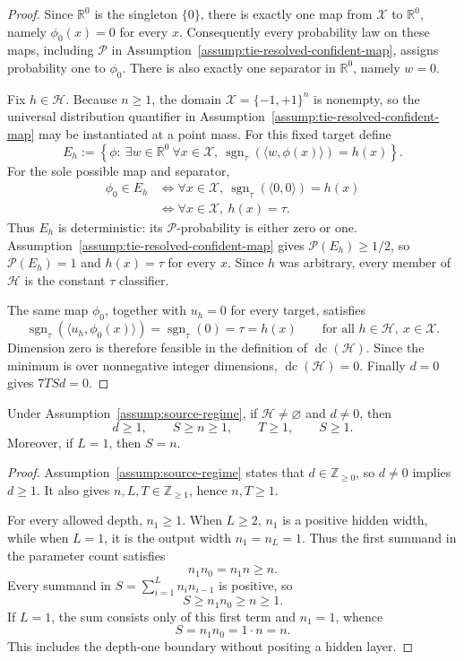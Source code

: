 \begin{proof}
Since $\mathbb R^0$ is the singleton $\{0\}$, there is exactly one map from
$\mathcal X$ to $\mathbb R^0$, namely $\phi_0(x)=0$ for every $x$.
Consequently every probability law on these maps, including $\mathcal P$ in
Assumption~\ref{assump:tie-resolved-confident-map}, assigns probability one
to $\phi_0$.  There is also exactly one separator in $\mathbb R^0$, namely
$w=0$.

Fix $h\in\mathcal H$.  Because $n\geq1$, the domain
$\mathcal X=\{-1,+1\}^n$ is nonempty, so the universal distribution
quantifier in Assumption~\ref{assump:tie-resolved-confident-map} may be
instantiated at a point mass.  For this fixed target define
\[
E_h:=\left\{\phi:\ \exists w\in\mathbb R^0\ \forall x\in\mathcal X,
\ \operatorname{sgn}_{\tau}(\langle w,\phi(x)\rangle)=h(x)\right\}.
\]
For the sole possible map and separator,
\[
\begin{aligned}
\phi_0\in E_h
&\iff
\forall x\in\mathcal X,
\ \operatorname{sgn}_{\tau}(\langle0,0\rangle)=h(x)\\
&\iff
\forall x\in\mathcal X,
\ h(x)=\tau.
\end{aligned}
\]
Thus $E_h$ is deterministic: its $\mathcal P$-probability is either zero or
one.  Assumption~\ref{assump:tie-resolved-confident-map} gives
$\mathcal P(E_h)\geq1/2$, so $\mathcal P(E_h)=1$ and $h(x)=\tau$ for every
$x$.  Since $h$ was arbitrary, every member of $\mathcal H$ is the constant
$\tau$ classifier.

The same map $\phi_0$, together with $u_h=0$ for every target, satisfies
\[
\operatorname{sgn}_{\tau}(\langle u_h,\phi_0(x)\rangle)
=\operatorname{sgn}_{\tau}(0)
=\tau
=h(x)
\qquad
\text{for all }h\in\mathcal H,
\ x\in\mathcal X.
\]
Dimension zero is therefore feasible in the definition of
$\operatorname{dc}(\mathcal H)$.  Since the minimum is over nonnegative
integer dimensions, $\operatorname{dc}(\mathcal H)=0$.  Finally $d=0$
gives $7TSd=0$.
\end{proof}

\begin{proposition}
\label{prop:step-001-architecture}
Under Assumption~\ref{assump:source-regime}, if
$\mathcal H\neq\varnothing$ and $d\neq0$, then
\[
d\geq1,
\qquad
S\geq n\geq1,
\qquad
T\geq1,
\qquad
S\geq1.
\]
Moreover, if $L=1$, then $S=n$.
\end{proposition}

\begin{proof}
Assumption~\ref{assump:source-regime} states that
$d\in\mathbb Z_{\geq0}$, so $d\neq0$ implies $d\geq1$.  It also gives
$n,L,T\in\mathbb Z_{\geq1}$, hence $n,T\geq1$.

For every allowed depth, $n_1\geq1$.  When $L\geq2$, $n_1$ is a positive
hidden width, while when $L=1$, it is the output width $n_1=n_L=1$.  Thus
the first summand in the parameter count satisfies
\[
n_1n_0=n_1n\geq n.
\]
Every summand in $S=\sum_{i=1}^L n_i n_{i-1}$ is positive, so
\[
S\geq n_1n_0\geq n\geq1.
\]
If $L=1$, the sum consists only of this first term and $n_1=1$, whence
\[
S=n_1n_0=1\cdot n=n.
\]
This includes the depth-one boundary without positing a hidden layer.
\end{proof}

